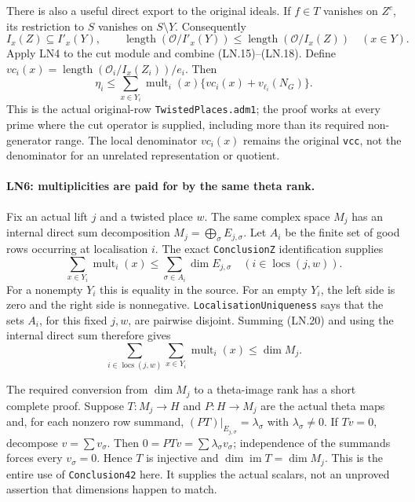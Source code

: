 There is also a useful direct export to the original ideals.  If
$f\in T$ vanishes on $Z^c$, its restriction to $S$ vanishes on
$S\setminus Y$.  Consequently
\[
 I_x(Z)\subseteq I'_x(Y),\qquad
 \operatorname{length}(\mathcal O/I'_x(Y))
       \le\operatorname{length}(\mathcal O/I_x(Z))\quad(x\in Y).
 \tag{LN.18}
\]
Apply LN4 to the cut module and combine (LN.15)--(LN.18).  Define
$v\!c_i(x)=\operatorname{length}(\mathcal O_i/I_x(Z_i))/e_i$.
Then
\[
 \boxed{\quad\eta_i\le
       \sum_{x\in Y_i}\operatorname{mult}_i(x)
           \{v\!c_i(x)+v_{\ell_i}(N_G)\}.\quad}        \tag{LN.19}
\]
This is the actual original-row \texttt{TwistedPlaces.adm1}; the
proof works at every prime where the cut operator is supplied,
including more than its required non-generator range.  The local
denominator $v\!c_i(x)$ remains the original \texttt{vcc}, not the
denominator for an unrelated representation or quotient.

\paragraph{LN6: multiplicities are paid for by the same theta rank.}
\label{claim:LN6}
Fix an actual lift $j$ and a twisted place $w$.  The same complex
space $M_j$ has an internal direct sum decomposition
$M_j=\bigoplus_\sigma E_{j,\sigma}$.  Let $A_i$ be the finite set
of good rows occurring at localisation $i$.  The exact
\texttt{ConclusionZ} identification supplies
\[
 \sum_{x\in Y_i}\operatorname{mult}_i(x)
          \le\sum_{\sigma\in A_i}\dim E_{j,\sigma}
           \quad(i\in\operatorname{locs}(j,w)).          \tag{LN.20}
\]
For a nonempty $Y_i$ this is equality in the source.  For an empty
$Y_i$, the left side is zero and the right side is nonnegative.
\texttt{LocalisationUniqueness} says that the sets $A_i$, for this
fixed $j,w$, are pairwise disjoint.  Summing (LN.20) and using the
internal direct sum therefore gives
\[
 \sum_{i\in\operatorname{locs}(j,w)}
          \sum_{x\in Y_i}\operatorname{mult}_i(x)\le\dim M_j.
 \tag{LN.21}
\]

The required conversion from $\dim M_j$ to a theta-image rank has
a short complete proof.  Suppose $T:M_j\to H$ and $P:H\to M_j$
are the actual theta maps and, for each nonzero row summand,
$(PT)|_{E_{j,\sigma}}=\lambda_\sigma$ with
$\lambda_\sigma\ne0$.  If $Tv=0$, decompose
$v=\sum v_\sigma$.  Then $0=PTv=\sum\lambda_\sigma v_\sigma$;
independence of the summands forces every $v_\sigma=0$.  Hence
$T$ is injective and $\dim\operatorname{im}T=\dim M_j$.
This is the entire use of \texttt{Conclusion42} here.  It supplies
the actual scalars, not an unproved assertion that dimensions happen
to match.

